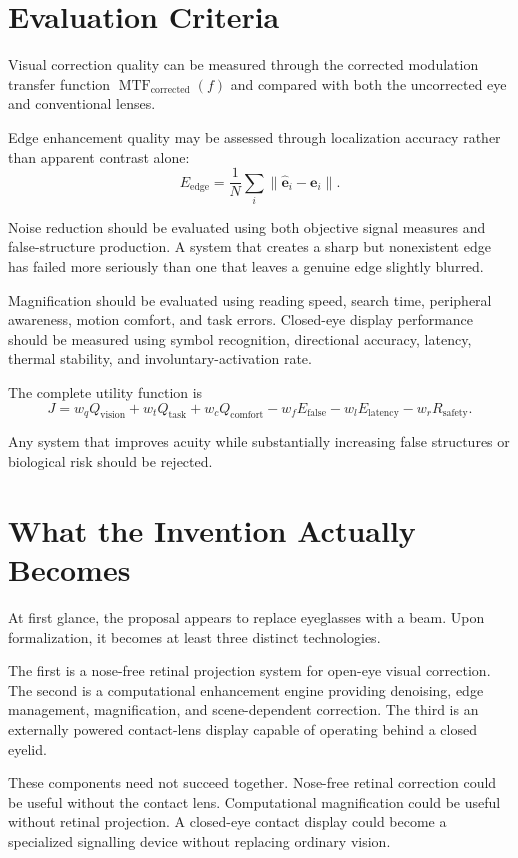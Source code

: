 \documentclass[11pt]{article}
\begin{document}
\section{Evaluation Criteria}

Visual correction quality can be measured through the corrected modulation transfer function $\operatorname{MTF}_{\mathrm{corrected}}(f)$ and compared with both the uncorrected eye and conventional lenses.

Edge enhancement quality may be assessed through localization accuracy rather than apparent contrast alone:
\[
E_{\mathrm{edge}}=\frac{1}{N}\sum_i\|\widehat{\mathbf{e}}_i-\mathbf{e}_i\|.
\]

Noise reduction should be evaluated using both objective signal measures and false-structure production. A system that creates a sharp but nonexistent edge has failed more seriously than one that leaves a genuine edge slightly blurred.

Magnification should be evaluated using reading speed, search time, peripheral awareness, motion comfort, and task errors. Closed-eye display performance should be measured using symbol recognition, directional accuracy, latency, thermal stability, and involuntary-activation rate.

The complete utility function is
\[
J=w_q Q_{\mathrm{vision}}+w_t Q_{\mathrm{task}}+w_c Q_{\mathrm{comfort}}-w_f E_{\mathrm{false}}-w_l E_{\mathrm{latency}}-w_r R_{\mathrm{safety}}.
\]

Any system that improves acuity while substantially increasing false structures or biological risk should be rejected.

\section{What the Invention Actually Becomes}

At first glance, the proposal appears to replace eyeglasses with a beam. Upon formalization, it becomes at least three distinct technologies.

The first is a nose-free retinal projection system for open-eye visual correction. The second is a computational enhancement engine providing denoising, edge management, magnification, and scene-dependent correction. The third is an externally powered contact-lens display capable of operating behind a closed eyelid.

These components need not succeed together. Nose-free retinal correction could be useful without the contact lens. Computational magnification could be useful without retinal projection. A closed-eye contact display could become a specialized signalling device without replacing ordinary vision.
\end{document}
